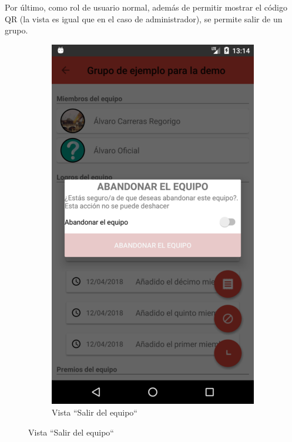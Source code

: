 \documentclass[twoside]{report}
\begin{document}
Por último, como rol de usuario normal, además de permitir mostrar el código QR (la vista es igual que en el caso de administrador), se permite salir de un grupo.
\begin{figure}[H]
\begin{center}
	\begin{subfigure}[t]{.3\linewidth}
		\includegraphics[scale=0.25]{images/userguide/21.png}
		\caption{Vista “Salir del equipo“}
	\end{subfigure}\hspace{5mm}%

\end{center}
\end{figure}
\end{document}
